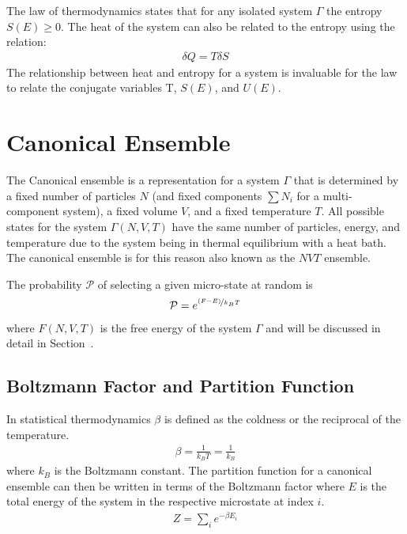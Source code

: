 The  law of thermodynamics states that for any isolated system $\Gamma$ the entropy $S(E) \geq 0$. The heat of the system can also be related to the entropy using the relation:
\begin{align}
    \delta Q = T\delta S
\end{align}
The relationship between heat and entropy for a system is invaluable for the  law to relate the conjugate variables T, $S(E)$, and $U(E)$.

\section{Canonical Ensemble}
The Canonical ensemble is a representation for a system $\Gamma$ that is determined by a fixed number of particles $N$ (and fixed components $\sum N_i$ for a multi-component system), a fixed volume $V$, and a fixed temperature $T$. All possible states for the system $\Gamma\left(N,V,T\right)$ have the same number of particles, energy, and temperature due to the system being in thermal equilibrium with a heat bath.
The canonical ensemble is for this reason also known as the $NVT$ ensemble.

The probability $\mathcal{P}$ of selecting a given micro-state at random is
\begin{align}
    \mathcal{P} = e^{\nicefrac{\left(F-E\right)}{k_BT}}
\end{align}
where $F\left(N,V,T\right)$ is the free energy of the system $\Gamma$ and will be discussed in detail in Section~.



\subsection{Boltzmann Factor and Partition Function}
In statistical thermodynamics $\beta$ is defined as the coldness or the reciprocal of the temperature.
\begin{align}
    \beta = \frac{1}{k_BT} = \frac{1}{k_B}
\end{align}
where $k_B$ is the Boltzmann constant. The partition function for a canonical ensemble can then be written in terms of the Boltzmann factor where $E$ is the total energy of the system in the respective microstate at index $i$.
\begin{align}
    Z = \sum_i e^{-\beta E_i}
\end{align}

